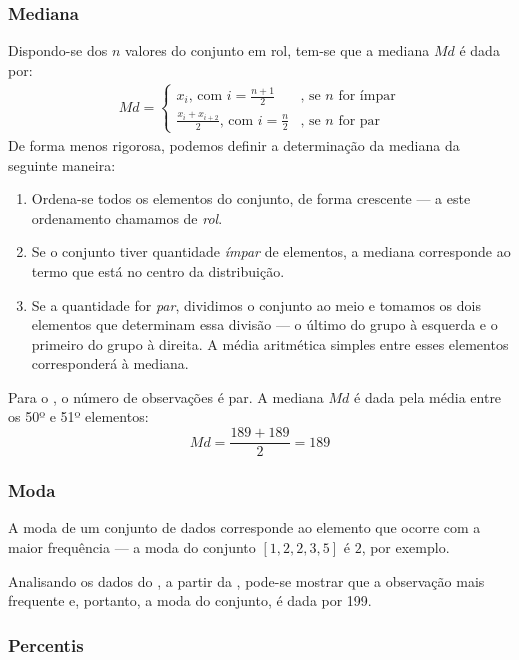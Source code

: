 \subsubsection{Mediana}
Dispondo-se dos $n$ valores do conjunto em rol, tem-se que a mediana $Md$ é
dada por:
\begin{equation}
    \begin{split}
    Md =
    \begin{cases}
        x_i \textrm{, com } i = \frac{n+1}{2} & \textrm{, se } n \textrm{ for ímpar} \\
        \frac{x_i + x_{i+2}}{2} \textrm{, com } i = \frac{n}{2} & \textrm{, se } n \textrm{ for par}
    \end{cases}
    \end{split}
\end{equation}
De forma menos rigorosa, podemos definir a determinação da mediana da
seguinte maneira:
\begin{enumerate}
    \item Ordena-se todos os elementos do conjunto, de forma crescente
    --- a este ordenamento chamamos de \emph{rol}.
    \item Se o conjunto tiver quantidade \emph{ímpar} de elementos, a
    mediana corresponde ao termo que está no centro da distribuição.
    \item Se a quantidade for \emph{par}, dividimos o conjunto ao meio e
    tomamos os dois elementos que determinam essa divisão --- o último do
    grupo à esquerda e o primeiro do grupo à direita. A média aritmética
    simples entre esses elementos corresponderá à mediana.
\end{enumerate}

Para o , o número de observações é par. A mediana $Md$
é dada pela média entre os 50º e 51º elementos:
\[
Md=\frac{189+189}{2}=189
\]

\subsubsection{Moda}
A moda de um conjunto de dados corresponde ao elemento que ocorre com a maior
frequência --- a moda do conjunto $[1,2,2,3,5]$ é $2$, por exemplo.

Analisando os dados do , a partir da
, pode-se mostrar que a observação mais
frequente e, portanto, a moda do conjunto, é dada por 199.

\subsubsection{Percentis}
\label{subsub:percentis}

